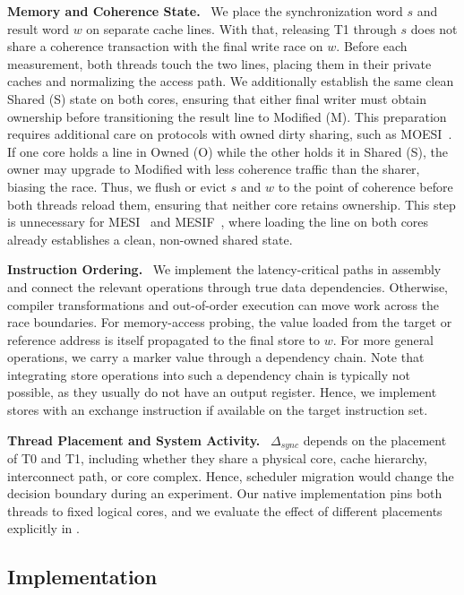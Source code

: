 \documentclass[letterpaper,twocolumn,10pt]{article} %
\newcommand{\paragrabf}[1]{\noindent \textbf{#1.}\ }
\newcommand{\tprobe}{{\fontfamily{cmtt}\selectfont T0}\xspace}
\newcommand{\tref}{{\fontfamily{cmtt}\selectfont T1}\xspace}
\newcommand{\corS}{{\fontfamily{cmtt}\selectfont S}\xspace}
\newcommand{\corM}{{\fontfamily{cmtt}\selectfont M}\xspace}
\newcommand{\corO}{{\fontfamily{cmtt}\selectfont O}\xspace}
\begin{document}
\paragrabf{Memory and Coherence State}
We place the synchronization word $s$ and result word $w$ on separate cache lines.
With that, releasing \tref through $s$ does not share a coherence transaction with the final write race on $w$.
Before each measurement, both threads touch the two lines, placing them in their private caches and normalizing the access path.
We additionally establish the same clean Shared (\corS) state on both cores, ensuring that either final writer must obtain ownership before transitioning the result line to Modified (\corM).
This preparation requires additional care on protocols with owned dirty sharing, such as MOESI~\cite{AMD64_vol2}.
If one core holds a line in Owned (\corO) while the other holds it in Shared (\corS), the owner may upgrade to Modified with less coherence traffic than the sharer, biasing the race.
Thus, we flush or evict $s$ and $w$ to the point of coherence before both threads reload them, ensuring that neither core retains ownership.
This step is unnecessary for MESI~\cite{papamarcos1984low} and MESIF~\cite{hum2005forward}, where loading the line on both cores already establishes a clean, non-owned shared state.

\paragrabf{Instruction Ordering}
We implement the latency-critical paths in assembly and connect the relevant operations through true data dependencies.
Otherwise, compiler transformations and out-of-order execution can move work across the race boundaries.
For memory-access probing, the value loaded from the target or reference address is itself propagated to the final store to $w$.
For more general operations, we carry a marker value through a dependency chain.
Note that integrating store operations into such a dependency chain is typically not possible, as they usually do not have an output register.
Hence, we implement stores with an exchange instruction if available on the target instruction set.

\paragrabf{Thread Placement and System Activity}
$\Delta_{sync}$ depends on the placement of \tprobe and \tref, including whether they share a physical core, cache hierarchy, interconnect path, or core complex.
Hence, scheduler migration would change the decision boundary during an experiment.
Our native implementation pins both threads to fixed logical cores, and we evaluate the effect of different placements explicitly in .


\subsection{Implementation}\label{subsec:implementation}
\end{document}
